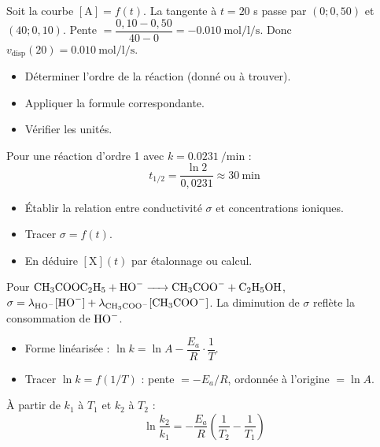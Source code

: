 \begin{exemple}
Soit la courbe $[\mathrm{A}] = f(t)$. La tangente à $t=20$ s passe par $(0; 0,50)$ et $(40; 0,10)$. Pente $= \dfrac{0,10-0,50}{40-0} = -\SI{0,010}{\mol\per\litre\per\second}$. Donc $v_{\text{disp}}(20) = \SI{0,010}{\mol\per\litre\per\second}$.
\end{exemple}

\begin{itemize}
\item Déterminer l'ordre de la réaction (donné ou à trouver).
\item Appliquer la formule correspondante.
\item Vérifier les unités.
\end{itemize}

\begin{exemple}
Pour une réaction d'ordre 1 avec $k = \SI{0,0231}{\per\minute}$ :
\[
t_{1/2} = \frac{\ln 2}{0,0231} \approx \SI{30}{\minute}
\]
\end{exemple}

\begin{itemize}
\item Établir la relation entre conductivité $\sigma$ et concentrations ioniques.
\item Tracer $\sigma = f(t)$.
\item En déduire $[\mathrm{X}](t)$ par étalonnage ou calcul.
\end{itemize}

\begin{exemple}
Pour $\ce{CH3COOC2H5 + HO- -> CH3COO- + C2H5OH}$, $\sigma = \lambda_{\ce{HO-}}[\ce{HO-}] + \lambda_{\ce{CH3COO-}}[\ce{CH3COO-}]$. La diminution de $\sigma$ reflète la consommation de $\ce{HO-}$.
\end{exemple}

\begin{itemize}
\item Forme linéarisée : $\ln k = \ln A - \dfrac{E_a}{R}\cdot\dfrac{1}{T}$.
\item Tracer $\ln k = f(1/T)$ : pente $= -E_a/R$, ordonnée à l'origine $= \ln A$.
\end{itemize}

\begin{exemple}
À partir de $k_1$ à $T_1$ et $k_2$ à $T_2$ :
\[
\ln\frac{k_2}{k_1} = -\frac{E_a}{R}\left(\frac{1}{T_2} - \frac{1}{T_1}\right)
\]
\end{exemple}

